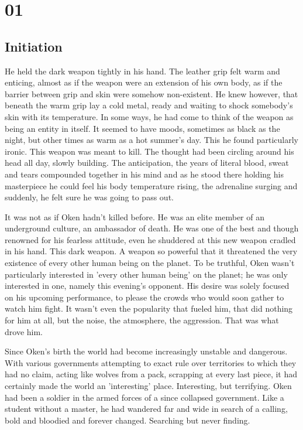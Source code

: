 \chapter{01}
\section{Initiation}


He held the dark weapon tightly in his hand. The leather grip felt warm and enticing, almost as if the weapon were an extension of his own body, as if the barrier between grip and skin were somehow non-existent. He knew however, that beneath the warm grip lay a cold metal, ready and waiting to shock somebody's skin with its temperature. In some ways, he had come to think of the weapon as being an entity in itself. It seemed to have moods, sometimes as black as the night, but other times as warm as a hot summer's day. This he found particularly ironic. This weapon was meant to kill. The thought had been circling around his head all day, slowly building. The anticipation, the years of literal blood, sweat and tears compounded together in his mind and as he stood there holding his masterpiece he could feel his body temperature rising, the adrenaline surging and suddenly, he felt sure he was going to pass out.

It was not as if Oken hadn't killed before. He was an elite member of an underground culture, an ambassador of death. He was one of the best and though renowned for his fearless attitude, even he shuddered at this new weapon cradled in his hand. This dark weapon. A weapon so powerful that it threatened the very existence of every other human being on the planet. To be truthful, Oken wasn't particularly interested in 'every other human being' on the planet; he was only interested in one, namely this evening's opponent. His desire was solely focused on his upcoming performance, to please the crowds who would soon gather to watch him fight. It wasn't even the popularity that fueled him, that did nothing for him at all, but the noise, the atmosphere, the aggression. That was what drove him.

Since Oken's birth the world had become increasingly unstable and dangerous. With various governments attempting to exact rule over territories to which they had no claim, acting like wolves from a pack, scrapping at every last piece, it had certainly made the world an 'interesting' place. Interesting, but terrifying. Oken had been a soldier in the armed forces of a since collapsed government. Like a student without a master, he had wandered far and wide in search of a calling, bold and bloodied and forever changed. Searching but never finding.

